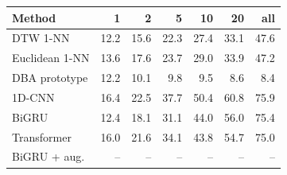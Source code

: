 \begin{tabular}{lrrrrrr}
\toprule
Method & 1 & 2 & 5 & 10 & 20 & all \\
\midrule
DTW 1-NN & 12.2 & 15.6 & 22.3 & 27.4 & 33.1 & 47.6 \\
Euclidean 1-NN & 13.6 & 17.6 & 23.7 & 29.0 & 33.9 & 47.2 \\
DBA prototype & 12.2 & 10.1 & 9.8 & 9.5 & 8.6 & 8.4 \\
1D-CNN & 16.4 & 22.5 & 37.7 & 50.4 & 60.8 & 75.9 \\
BiGRU & 12.4 & 18.1 & 31.1 & 44.0 & 56.0 & 75.4 \\
Transformer & 16.0 & 21.6 & 34.1 & 43.8 & 54.7 & 75.0 \\
BiGRU + aug. & -- & -- & -- & -- & -- & -- \\
\bottomrule
\end{tabular}
